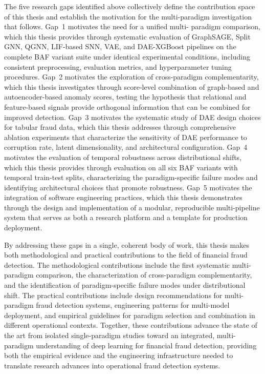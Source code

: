 The five research gaps identified above collectively define the contribution
space of this thesis and establish the motivation for the multi-paradigm
investigation that follows. Gap~1 motivates the need for a unified multi-
paradigm comparison, which this thesis provides through systematic evaluation of
GraphSAGE, Split GNN, QGNN, LIF-based SNN, VAE, and DAE-XGBoost pipelines on the
complete BAF variant suite under identical experimental conditions, including
consistent preprocessing, evaluation metrics, and hyperparameter tuning
procedures. Gap~2 motivates the exploration of cross-paradigm complementarity,
which this thesis investigates through score-level combination of graph-based
and autoencoder-based anomaly scores, testing the hypothesis that relational and
feature-based signals provide orthogonal information that can be combined for
improved detection. Gap~3 motivates the systematic study of DAE design choices
for tabular fraud data, which this thesis addresses through comprehensive
ablation experiments that characterize the sensitivity of DAE performance to
corruption rate, latent dimensionality, and architectural configuration. Gap~4
motivates the evaluation of temporal robustness across distributional shifts,
which this thesis provides through evaluation on all six BAF variants with
temporal train-test splits, characterizing the paradigm-specific failure modes
and identifying architectural choices that promote robustness. Gap~5 motivates
the integration of software engineering practices, which this thesis
demonstrates through the design and implementation of a modular, reproducible
multi-pipeline system that serves as both a research platform and a template for
production deployment.

By addressing these gaps in a single, coherent body of work, this thesis makes
both methodological and practical contributions to the field of financial fraud
detection. The methodological contributions include the first systematic multi-
paradigm comparison, the characterization of cross-paradigm complementarity, and
the identification of paradigm-specific failure modes under distributional
shift. The practical contributions include design recommendations for multi-
paradigm fraud detection systems, engineering patterns for multi-model
deployment, and empirical guidelines for paradigm selection and combination in
different operational contexts. Together, these contributions advance the state
of the art from isolated single-paradigm studies toward an integrated, multi-
paradigm understanding of deep learning for financial fraud detection, providing
both the empirical evidence and the engineering infrastructure needed to
translate research advances into operational fraud detection systems.
